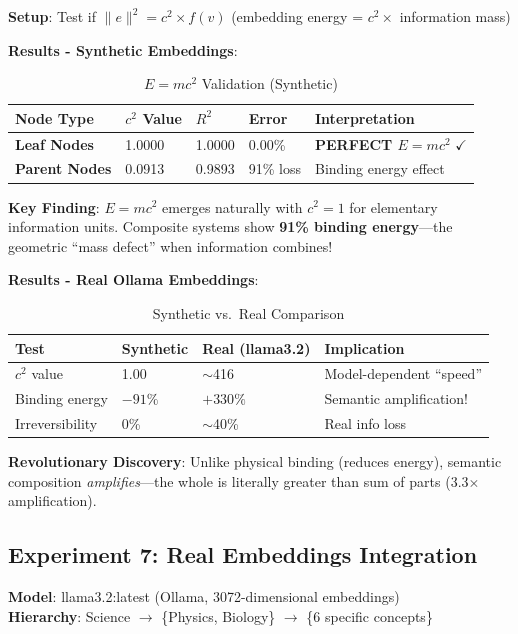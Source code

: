 \documentclass[11pt,a4paper]{article}
\newcommand{\norm}[1]{\|#1\|}
\begin{document}
\textbf{Setup}: Test if $\norm{e}^2 = c^2 \times f(v)$ (embedding energy = $c^2 \times$ information mass)

\textbf{Results - Synthetic Embeddings}:

\begin{table}[h]
\centering
\begin{tabular}{lllll}
\toprule
\textbf{Node Type} & \textbf{$c^2$ Value} & \textbf{$R^2$} & \textbf{Error} & \textbf{Interpretation} \\
\midrule
\textbf{Leaf Nodes} & 1.0000 & 1.0000 & 0.00\% & \textbf{PERFECT $E=mc^2$} $\checkmark$ \\
\textbf{Parent Nodes} & 0.0913 & 0.9893 & 91\% loss & Binding energy effect \\
\bottomrule
\end{tabular}
\caption{$E=mc^2$ Validation (Synthetic)}
\end{table}

\textbf{Key Finding}: $E=mc^2$ emerges naturally with $c^2=1$ for elementary information units. Composite systems show \textbf{91\% binding energy}---the geometric ``mass defect'' when information combines!

\textbf{Results - Real Ollama Embeddings}:

\begin{table}[h]
\centering
\begin{tabular}{llll}
\toprule
\textbf{Test} & \textbf{Synthetic} & \textbf{Real (llama3.2)} & \textbf{Implication} \\
\midrule
$c^2$ value & 1.00 & $\sim$416 & Model-dependent ``speed'' \\
Binding energy & $-91\%$ & $+330\%$ & Semantic amplification! \\
Irreversibility & 0\% & $\sim$40\% & Real info loss \\
\bottomrule
\end{tabular}
\caption{Synthetic vs.\ Real Comparison}
\end{table}

\textbf{Revolutionary Discovery}: Unlike physical binding (reduces energy), semantic composition \emph{amplifies}---the whole is literally greater than sum of parts (3.3$\times$ amplification).

\subsection{Experiment 7: Real Embeddings Integration}

\textbf{Model}: llama3.2:latest (Ollama, 3072-dimensional embeddings)\\
\textbf{Hierarchy}: Science $\to$ \{Physics, Biology\} $\to$ \{6 specific concepts\}
\end{document}
